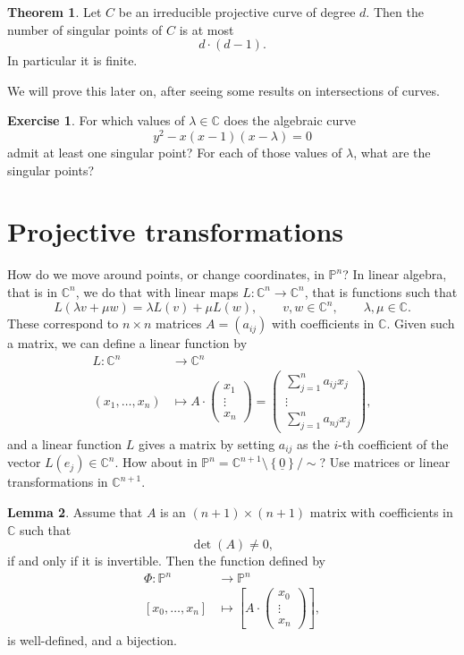 \documentclass{article}
\newcommand{\C}{\mathbb{C}}
\renewcommand{\P}{\mathbb{P}}
\newcommand{\rb}[1]{\left( #1 \right)}
\renewcommand{\sb}[1]{\left[ #1 \right]}
\newcommand{\cb}[1]{\left\{ #1 \right\}}
\theoremstyle{definition}\newtheorem{definition}{Definition}[section]
\theoremstyle{definition}\newtheorem{notation}[definition]{Notation}
\theoremstyle{definition}\newtheorem{remark}[definition]{Remark}
\theoremstyle{definition}\newtheorem{example1}[definition]{Example}
\theoremstyle{definition}\newtheorem{fact}{Fact}
\theoremstyle{definition}\newtheorem{exercise}{Exercise}
\theoremstyle{definition}\newtheorem*{example2}{Example}
\newtheorem{lemma}[definition]{Lemma}
\newtheorem{theorem}[definition]{Theorem}
\begin{document}
\begin{theorem}
\label{thm:7.11}
Let $ C $ be an irreducible projective curve of degree $ d $. Then the number of singular points of $ C $ is at most
$$ d \cdot \rb{d - 1}. $$
In particular it is finite.
\end{theorem}

We will prove this later on, after seeing some results on intersections of curves.

\begin{exercise}
For which values of $ \lambda \in \C $ does the algebraic curve
$$ y^2 - x\rb{x - 1}\rb{x - \lambda} = 0 $$
admit at least one singular point? For each of those values of $ \lambda $, what are the singular points?
\end{exercise}

\pagebreak

\section{Projective transformations}

How do we move around points, or change coordinates, in $ \P^n $? In linear algebra, that is in $ \C^n $, we do that with linear maps $ L : \C^n \to \C^n $, that is functions such that
$$ L\rb{\lambda v + \mu w} = \lambda L\rb{v} + \mu L\rb{w}, \qquad v, w \in \C^n, \qquad \lambda, \mu \in \C. $$
These correspond to $ n \times n $ matrices $ A = \rb{a_{ij}} $ with coefficients in $ \C $. Given such a matrix, we can define a linear function by
\begin{align*}
L : \C^n & \to \C^n \\
\rb{x_1, \dots, x_n} & \mapsto A \cdot \begin{pmatrix}
x_1 \\
\vdots \\
x_n
\end{pmatrix} = \begin{pmatrix}
\sum_{j = 1}^n a_{ij}x_j \\
\vdots \\
\sum_{j = 1}^n a_{nj}x_j
\end{pmatrix},
\end{align*}
and a linear function $ L $ gives a matrix by setting $ a_{ij} $ as the $ i $-th coefficient of the vector $ L\rb{e_j} \in \C^n $. How about in $ \P^n = \C^{n + 1} \setminus \cb{\underline{0}} / \sim $? Use matrices or linear transformations in $ \C^{n + 1} $.

\begin{lemma}
\label{lem:8.1}
Assume that $ A $ is an $ \rb{n + 1} \times \rb{n + 1} $ matrix with coefficients in $ \C $ such that
$$ \det\rb{A} \ne 0, $$
if and only if it is invertible. Then the function defined by
\begin{align*}
\Phi : \P^n & \to \P^n \\
\sb{x_0, \dots, x_n} & \mapsto \sb{A \cdot \begin{pmatrix}
x_0 \\
\vdots \\
x_n
\end{pmatrix}},
\end{align*}
is well-defined, and a bijection.
\end{lemma}
\end{document}
